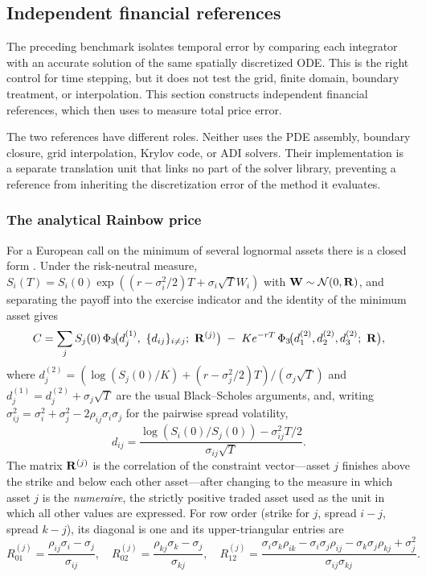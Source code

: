 \subsection{Independent financial references}\label{sec:reference}

The preceding benchmark isolates temporal error by comparing each integrator with an accurate solution of the same spatially discretized ODE. This is the right control for time stepping, but it does not test the grid, finite domain, boundary treatment, or interpolation. This section constructs independent financial references, which  then uses to measure total price error.

The two references have different roles. Neither uses the PDE assembly, boundary closure, grid interpolation, Krylov code, or ADI solvers. Their implementation is a separate translation unit that links no part of the solver library, preventing a reference from inheriting the discretization error of the method it evaluates.

\subsubsection{The analytical Rainbow price}\label{sec:reference-johnson}

For a European call on the minimum of several lognormal assets there is a closed form \cite{johnson-1987}. Under the risk-neutral measure, $S_i(T) = S_i(0)\exp((r - \sigma_i^2/2)T + \sigma_i\sqrt{T}W_i)$ with $\mathbf{W}\sim\mathcal{N}(0,\mathbf{R})$, and separating the payoff into the exercise indicator and the identity of the minimum asset gives
\begin{equation}
C = \sum_{j} S_j(0)\,\Phi_3\!\big(d^{(1)}_j,\ \{d_{ij}\}_{i\neq j};\ \mat{R}^{(j)}\big)
\;-\; K e^{-rT}\,\Phi_3\!\big(d^{(2)}_1, d^{(2)}_2, d^{(2)}_3;\ \mat{R}\big),
\label{eq:johnson}
\end{equation}
where $d^{(2)}_j = (\log(S_j(0)/K) + (r - \sigma_j^2/2)T)/(\sigma_j\sqrt{T})$ and $d^{(1)}_j = d^{(2)}_j + \sigma_j\sqrt{T}$ are the usual Black--Scholes arguments, and, writing $\sigma_{ij}^2 = \sigma_i^2 + \sigma_j^2 - 2\rho_{ij}\sigma_i\sigma_j$ for the pairwise spread volatility,
\[
d_{ij} = \frac{\log(S_i(0)/S_j(0)) - \sigma_{ij}^2 T/2}{\sigma_{ij}\sqrt{T}}.
\]
The matrix $\mathbf{R}^{(j)}$ is the correlation of the constraint vector---asset $j$ finishes above the strike and below each other asset---after changing to the measure in which asset $j$ is the \emph{numeraire}, the strictly positive traded asset used as the unit in which all other values are expressed. For row order (strike for $j$, spread $i-j$, spread $k-j$), its diagonal is one and its upper-triangular entries are
\[
R^{(j)}_{01}=\frac{\rho_{ij}\sigma_i-\sigma_j}{\sigma_{ij}},\quad
R^{(j)}_{02}=\frac{\rho_{kj}\sigma_k-\sigma_j}{\sigma_{kj}},\quad
R^{(j)}_{12}=\frac{\sigma_i\sigma_k\rho_{ik}-\sigma_i\sigma_j\rho_{ij}-\sigma_k\sigma_j\rho_{kj}+\sigma_j^2}{\sigma_{ij}\sigma_{kj}}.
\]

